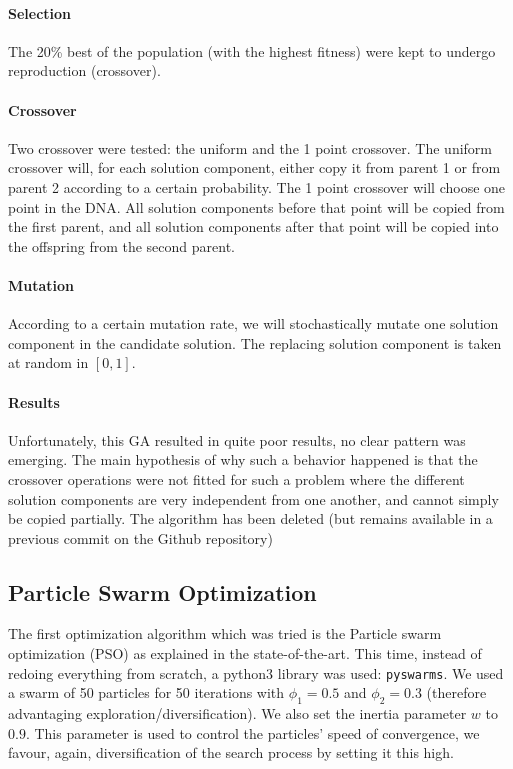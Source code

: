         \paragraph{Selection} The 20\% best of the population (with the highest fitness) were kept to undergo reproduction (crossover).

        \paragraph{Crossover} Two crossover were tested: the uniform and the 1 point crossover. The uniform crossover will, for each solution component, either copy it from parent 1 or from parent 2 according to a certain probability. The 1 point crossover will choose one point in the DNA. All solution components before that point will be copied from the first parent, and all solution components after that point will be copied into the offspring from the second parent.

        \paragraph{Mutation} According to a certain mutation rate, we will stochastically mutate one solution component in the candidate solution. The replacing solution component is taken at random in $[0, 1]$.

        \paragraph{Results} Unfortunately, this GA resulted in quite poor results, no clear pattern was emerging. The main hypothesis of why such a behavior happened is that the crossover operations were not fitted for such a problem where the different solution components are very independent from one another, and cannot simply be copied partially. The algorithm has been deleted (but remains available in a previous commit on the Github repository)

    \subsection{Particle Swarm Optimization}

    The first optimization algorithm which was tried is the Particle swarm optimization (PSO) as explained in the state-of-the-art. This time, instead of redoing everything from scratch, a python3 library was used: \texttt{pyswarms}. We used a swarm of 50 particles for 50 iterations with $\phi_1 = 0.5$ and $\phi_2 = 0.3$ (therefore advantaging exploration/diversification). We also set the inertia parameter $w$ to $0.9$. This parameter is used to control the particles' speed of convergence, we favour, again, diversification of the search process by setting it this high. \cite{psoDorigo}
    
